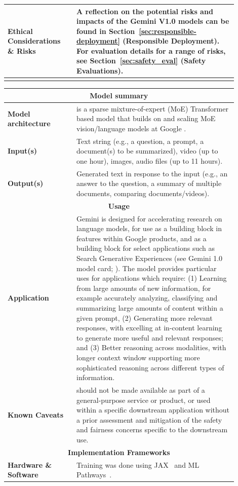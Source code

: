 \begin{longtable}{p{0.27\linewidth}p{0.63\linewidth}}
\midrule
\textbf{Ethical Considerations \& Risks} & A reflection on the potential risks and impacts of the Gemini V1.0 models can be found in Section~\ref{sec:responsible-deployment} (Responsible Deployment). For evaluation details for a range of risks, see Section~\ref{sec:safety_eval} (Safety Evaluations). \\
\bottomrule
\label{tab:modelcard}
\end{longtable}

\iffalse
\begin{longtable}{p{0.27\linewidth}p{0.63\linewidth}}
\toprule
\multicolumn{2}{c}{\textbf{Model summary}} \\ [0.5ex] \midrule
\textbf{Model architecture} & \modelname{} is a sparse mixture-of-expert (MoE) Transformer based model that builds on and scaling MoE vision/language models at Google \citep{shazeer2017outrageously, lepikhin2020gshard, fedus2021switch, zoph2022designing, clark2020transformers, riquelme2021scaling}. \\
\midrule
\textbf{Input(s)} & Text string (e.g., a question, a prompt, a document(s) to be summarized), video (up to one hour), images, audio files (up to 11 hours). \\
\midrule
\textbf{Output(s)} & Generated text in response to the input (e.g., an answer to the question, a summary of multiple documents, comparing documents/videos). \\
\midrule
\multicolumn{2}{c}{\textbf{Usage}} \\ \midrule
\textbf{Application} & Gemini is designed for accelerating research on language models, for use as a building block in features within Google products, and as a building block for select applications such as Search Generative Experiences (see Gemini 1.0 model card; \citealp{geminiteam2023gemini}). The \modelname{} model provides particular uses for applications which require: (1) Learning from large amounts of new information, for example accurately analyzing, classifying and summarizing large amounts of content within a given prompt, (2) Generating more relevant responses, with \modelname{} excelling at in-content learning to generate more useful and relevant responses; and (3) Better reasoning across modalities, with longer context window supporting more sophisticated reasoning across different types of information. \\
\midrule
\textbf{\textbf{Known Caveats}} & \modelname{} should not be made available as part of a general-purpose service or product, or used within a specific downstream application without a prior assessment and mitigation of the safety and fairness concerns specific to the downstream use. \\
\midrule
\multicolumn{2}{c}{\textbf{Implementation Frameworks}} \\ \midrule
\textbf{Hardware \& Software} & Training was done using JAX~\cite{jax} and ML Pathways~\cite{2021pathwaysarchitecture}.


\end{longtable}
